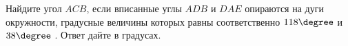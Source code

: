 \begin{ex}
	\begin{condition}
		Найдите угол \( ACB \), если вписанные углы \( ADB \) и \( DAE \) опираются на дуги окружности, градусные величины которых равны соответственно \( 118 \degree \)  и \(  38 \degree \) . Ответ дайте в градусах.
	\end{condition}
\end{ex}